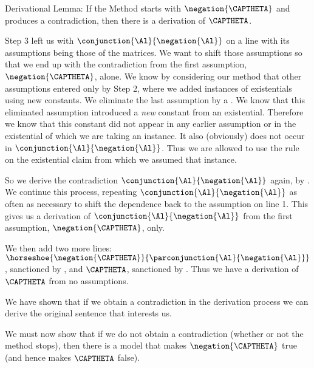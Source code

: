 \begin{THEOREM}{ Derivational Lemma:}
If the Method starts with $\negation{\CAPTHETA}$ and produces a contradiction, then there is a derivation of $\CAPTHETA$.
\end{THEOREM}
\begin{PROOF}
Step 3 left us with $\conjunction{\Al}{\negation{\Al}}$ on a line with its assumptions being those of the matrices. 
We want to shift those assumptions so that we end up with the contradiction from the first assumption, $\negation{\CAPTHETA}$, alone.
We know by considering our method that other assumptions entered only by Step 2, where we added instances of existentials using new constants. 
We eliminate the last assumption by a . 
We know that this eliminated assumption introduced a \emph{new} constant from an existential. 
Therefore we know that this constant did not appear in any earlier assumption or in the existential of which we are taking an instance.
It also (obviously) does not occur in $\conjunction{\Al}{\negation{\Al}}$.
Thus we are allowed to use the rule  on the existential claim from which we assumed that instance. 

So we derive the contradiction $\conjunction{\Al}{\negation{\Al}}$ again, by . 
We continue this process, repeating $\conjunction{\Al}{\negation{\Al}}$ as often as necessary to shift the dependence back to the assumption on line 1. 
This gives us a derivation of $\conjunction{\Al}{\negation{\Al}}$ from the first assumption, $\negation{\CAPTHETA}$, only. 

We then add two more lines: $\horseshoe{\negation{\CAPTHETA}}{\parconjunction{\Al}{\negation{\Al}}}$, sanctioned by , and $\CAPTHETA$, sanctioned by . 
Thus we have a derivation of $\CAPTHETA$ from no assumptions. 
\end{PROOF}

We have shown that if we obtain a contradiction in the derivation process we can derive the original sentence that interests us.


We must now show that if we do not obtain a contradiction (whether or not the method stops), then there is a model that makes $\negation{\CAPTHETA}$ true (and hence makes $\CAPTHETA$ false).

